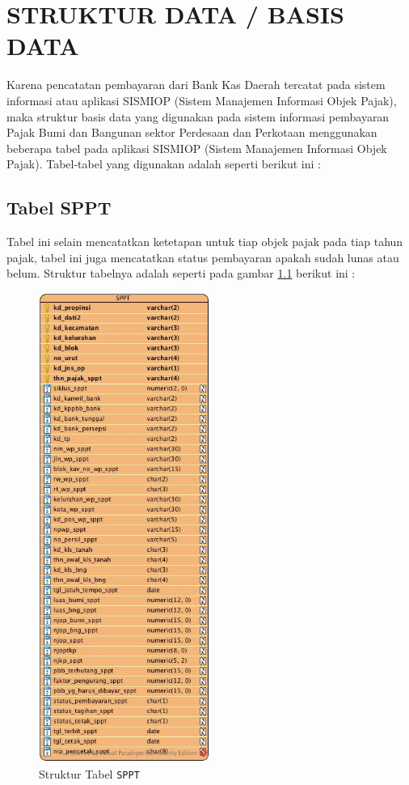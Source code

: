 \chapter{STRUKTUR DATA / BASIS DATA}

Karena pencatatan pembayaran dari Bank Kas Daerah tercatat pada sistem informasi atau aplikasi SISMIOP (Sistem Manajemen Informasi Objek Pajak), maka struktur basis data yang digunakan pada sistem informasi pembayaran Pajak Bumi dan Bangunan sektor Perdesaan dan Perkotaan menggunakan beberapa tabel pada aplikasi SISMIOP (Sistem Manajemen Informasi Objek Pajak). Tabel-tabel yang digunakan adalah seperti berikut ini :

\section{Tabel SPPT}

Tabel ini selain mencatatkan ketetapan untuk tiap objek pajak pada tiap tahun pajak, tabel ini juga mencatatkan status pembayaran apakah sudah lunas atau belum. Struktur tabelnya adalah seperti pada gambar \ref{fig:struktur-sppt} berikut ini :

\begin{figure}[H]
	\centering
	\includegraphics[width=0.5\textwidth]{./resources/struktur-tabel-sppt}
	\caption{Struktur Tabel \texttt{SPPT}}
	\label{fig:struktur-sppt}
\end{figure}

